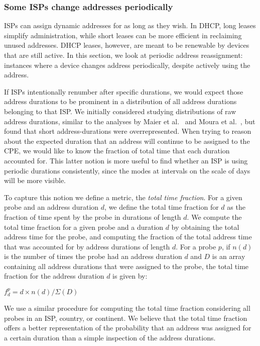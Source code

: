 \subsubsection{Some ISPs change addresses periodically}


ISPs can assign dynamic addresses for as long as they wish.
In DHCP, long leases simplify administration, while short
leases can be more efficient in reclaiming unused addresses.
DHCP leases, however, are meant to be renewable by devices
that are still active.  In this section, we look at periodic
address reassignment: instances where a device changes
address periodically, despite actively using the address.

If ISPs intentionally renumber after specific durations, we would
expect those address durations to be prominent in a distribution
of all address durations belonging to that ISP. We initially
considered studying distributions
of raw address durations, similar to the analyses by
Maier et al.~\cite{maier2009dominant} and
Moura et al.~\cite{zmap-dhcp}, but found that short address-durations
were overrepresented. When trying to reason about the expected duration that an address will
continue to be assigned to the CPE, we would like to know the fraction
of total time that each duration accounted for. This latter notion is more useful to find whether an
ISP is using periodic durations consistently, since the modes at
intervals on the scale of days will be more visible. 

To capture this notion we
define a metric, the \emph{total time fraction}. For a given probe and an address duration $d$,
we define the total time fraction for $d$ as the fraction of time spent by the probe in durations of length $d$.
We compute the total time fraction for a given probe and a duration
$d$ by obtaining the total address
time for the probe, and computing the fraction of the total
address time that was accounted for by address durations of 
length $d$. For a probe $p$, if $n(d)$ is the number of times the probe had an address duration
$d$ and $D$ is an array containing all address durations that were assigned to
the probe, the total time fraction for the address duration $d$ is
given by:

$f^p_d =  d \times n(d) / \Sigma(D)$

We use a similar procedure for computing the total time fraction
considering all probes in an ISP, country, or continent. We believe that  
the total time fraction offers a better representation of 
the
probability that an address was assigned for a certain
duration than a simple inspection of the address durations. 

